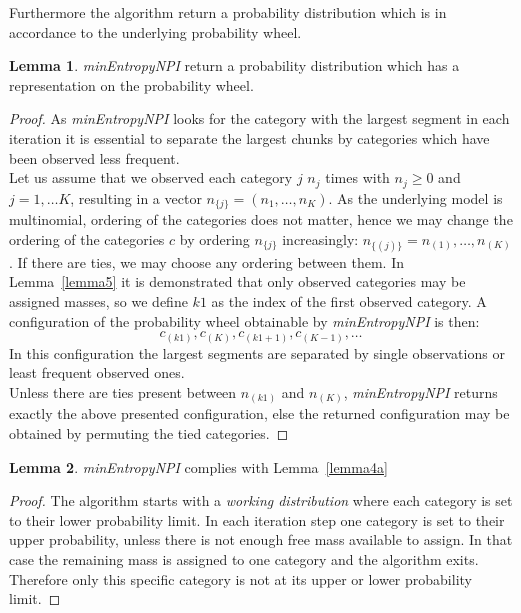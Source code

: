 \documentclass[a4paper]{article}
\theoremstyle{definition} \newtheorem{lemma}{Lemma}
\theoremstyle{remark} \newtheorem{remark}{Remark}
\begin{document}
Furthermore the algorithm return a probability distribution which is in accordance to the underlying probability wheel.
\begin{lemma}
\emph{minEntropyNPI} return a probability distribution which has a representation on the probability wheel. 
\end{lemma}
\begin{proof}
As \emph{minEntropyNPI} looks for the category with the largest segment in each iteration it is essential to separate the largest chunks by categories which have been observed less frequent.\\
Let us assume that we observed each category $j$ $n_j$ times with $n_j \geq 0$ and $j = 1, \ldots K$, resulting in a vector $n_{\{j\}} = (n_1,\ldots, n_K)$. As the underlying model is multinomial, ordering of the categories does not matter, hence we may change the ordering of the categories $c$ by ordering $n_{\{j\}}$ increasingly: $n_{\{(j)\}} = {n_{(1)}, \ldots, n_{(K)}}$. If there are ties, we may choose any ordering between them. In Lemma~\ref{lemma5} it is demonstrated that only observed categories may be assigned masses, so we define $k1$ as the index of the first observed category. A configuration of the probability wheel obtainable by \emph{minEntropyNPI} is then:
\begin{displaymath}
c_{(k1)}, c_{(K)}, c_{(k1+1)}, c_{(K-1)}, \ldots
\end{displaymath}
In this configuration the largest segments are separated by single observations or least frequent observed ones.\\
Unless there are ties present between $n_{(k1)}$ and $n_{(K)}$, \emph{minEntropyNPI} returns exactly the above presented configuration, else the returned configuration may be obtained by permuting the tied categories. 
\end{proof}

\begin{lemma}
\emph{minEntropyNPI} complies with Lemma~\ref{lemma4a}
\end{lemma}
\begin{proof}
The algorithm starts with a \emph{working distribution} where each category is set to their lower probability limit. In each iteration step one category is set to their upper probability, unless there is not enough free mass available to assign. In that case the remaining mass is assigned to one category and the algorithm exits. Therefore only this specific category is not at its upper or lower probability limit.
\end{proof}
\end{document}
